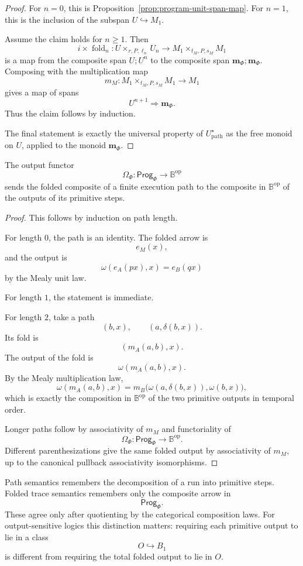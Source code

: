 \begin{proof}
For \(n=0\), this is Proposition~\ref{prop:program-unit-span-map}. For \(n=1\), this is the inclusion of the subspan \(U\hookrightarrow M_1\).

Assume the claim holds for \(n\ge1\). Then
\[
i\times\operatorname{fold}_n:
U\times_{r,P,\ell_n}U_n
\to
M_1\times_{t_M,P,s_M}M_1
\]
is a map from the composite span \(U;U^n\) to the composite span \(\mathbf m_\Phi;\mathbf m_\Phi\). Composing with the multiplication map
\[
m_M:M_1\times_{t_M,P,s_M}M_1\to M_1
\]
gives a map of spans
\[
U^{n+1}\Rightarrow\mathbf m_\Phi.
\]
Thus the claim follows by induction.

The final statement is exactly the universal property of \(U^\star_{\mathrm{path}}\) as the free monoid on \(U\), applied to the monoid \(\mathbf m_\Phi\).
\end{proof}

\begin{proposition}
\label{prop:folded-outputs}
The output functor
\[
\Omega_\Phi:\mathsf{Prog}_\Phi\to\mathbb B^{\mathrm{op}}
\]
sends the folded composite of a finite execution path to the composite in \(\mathbb B^{\mathrm{op}}\) of the outputs of its primitive steps.
\end{proposition}

\begin{proof}
This follows by induction on path length.

For length \(0\), the path is an identity. The folded arrow is
\[
e_M(x),
\]
and the output is
\[
\omega(e_A(px),x)=e_B(qx)
\]
by the Mealy unit law.

For length \(1\), the statement is immediate.

For length \(2\), take a path
\[
(b,x),
\qquad
(a,\delta(b,x)).
\]
Its fold is
\[
(m_A(a,b),x).
\]
The output of the fold is
\[
\omega(m_A(a,b),x).
\]
By the Mealy multiplication law,
\[
\omega(m_A(a,b),x)
=
m_B\bigl(\omega(a,\delta(b,x)),\omega(b,x)\bigr),
\]
which is exactly the composition in \(\mathbb B^{\mathrm{op}}\) of the two primitive outputs in temporal order.

Longer paths follow by associativity of \(m_M\) and functoriality of
\[
\Omega_\Phi:\mathsf{Prog}_\Phi\to\mathbb B^{\mathrm{op}}.
\]
Different parenthesizations give the same folded output by associativity of \(m_M\), up to the canonical pullback associativity isomorphisms.
\end{proof}

\begin{remark}
\label{rem:path-versus-folded-output}
Path semantics remembers the decomposition of a run into primitive steps. Folded trace semantics remembers only the composite arrow in
\[
\mathsf{Prog}_\Phi.
\]
These agree only after quotienting by the categorical composition laws. For output-sensitive logics this distinction matters: requiring each primitive output to lie in a class
\[
O\hookrightarrow B_1
\]
is different from requiring the total folded output to lie in \(O\).
\end{remark}

